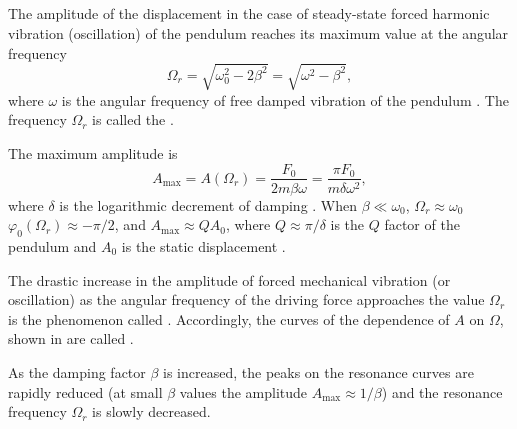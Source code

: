 \subsection{}\label{29.2.3} The amplitude of the displacement in the case of steady-state forced harmonic vibration (oscillation) of the pendulum reaches its maximum value at the angular frequency
\begin{equation*}%
\Omega_{r} = \sqrt{\omega_{0}^{2} - 2 \beta^{2}} = \sqrt{\omega^{2} - \beta^{2}},
\end{equation*}
where $\omega$ is the angular frequency of free damped vibration of the pendulum . The frequency $\Omega_{r}$ is called the .

The maximum amplitude is
\begin{equation*}%
A_{\text{max}} = A(\Omega_{r}) = \frac{F_{0}}{2m\beta \omega} = \frac{\pi F_{0}}{m\delta \omega^{2}},
\end{equation*}
where $\delta$ is the logarithmic decrement of damping . When $\beta \ll \omega_{0}$, $\Omega_{r} \approx \omega_{0}$
$\varphi_{0}(\Omega_{r}) \approx  -\pi/2$, and $A_{\text{max}} \approx Q A_{0}$, where $Q  \approx \pi/\delta$ is the $Q$ factor of the pendulum  and $A_{0}$ is the static displacement .

The drastic increase in the amplitude of forced mechanical vibration (or oscillation) as the angular frequency of the driving force approaches the value $\Omega_{r}$ is the phenomenon called . Accordingly, the curves of the dependence of $A$ on $\Omega$, shown in  are called .

As the damping factor $\beta$ is increased, the peaks on the resonance curves are rapidly reduced (at small $\beta$ values the amplitude $A_{\text{max}} \approx 1/\beta$) and the resonance frequency $\Omega_{r}$ is slowly decreased.


